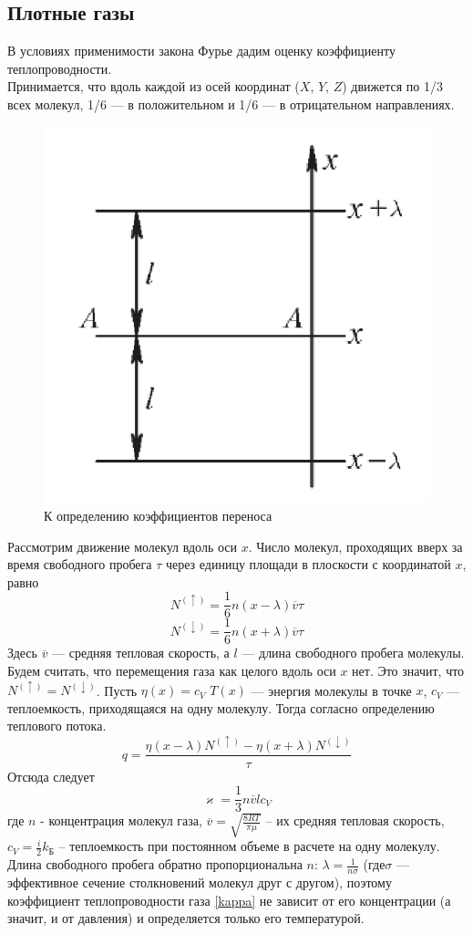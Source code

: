 \documentclass[12pt]{article}
\begin{document}
        \subsection{Плотные газы} В условиях применимости закона Фурье дадим оценку коэффициенту теплопроводности.\\
        Принимается, что вдоль каждой из осей координат ($X$, $Y$, $Z$) движется по 1/3 всех молекул, 1/6 — в положительном
        и 1/6 — в отрицательном направлениях.\\
        \begin{figure}[H]
            \centering
            \includegraphics[width=0.4\linewidth]{furie_image.png}
            \caption{К определению коэффициентов переноса}
            \label{fig:furie}
        \end{figure}
        Рассмотрим движение молекул вдоль оси $x$. Число молекул, проходящих вверх за время свободного пробега $\tau$ через
        единицу площади в плоскости с координатой $x$, равно
        \[ N^{(\uparrow)} = \frac{1}{6}n(x-\lambda) \overline{v} \tau \]
        \[ N^{(\downarrow)} = \frac{1}{6}n(x+\lambda) \overline{v} \tau \]
        Здесь $\overline{v}$ — средняя тепловая скорость, а $l$ — длина свободного пробега молекулы.\\
        Будем считать, что перемещения газа как целого вдоль оси $x$ нет. Это значит, что $N^{(\uparrow)} =  N^{(\downarrow)}$.
        Пусть $\eta(x) = c_V$ $T(x)$ — энергия молекулы в точке $x$, $c_V$ — теплоемкость, приходящаяся на одну молекулу.
        Тогда согласно определению теплового потока.
        \[
            q = \frac{\eta(x-\lambda)N^{(\uparrow)} - \eta(x+\lambda)N^{(\downarrow)}}{\tau}
        \]
        Отсюда следует
        \begin{equation}\label{kappa}
            \varkappa = \frac{1}{3} n \overline{v}lc_V
        \end{equation}
        где $n$ - концентрация молекул газа, $\overline{v} = \sqrt{\frac{8RT}{\pi\mu}}$ -- их средняя тепловая скорость,
        $c_V = \frac{i}{2}k_{\text{Б}}$ -- теплоемкость при постоянном объеме в расчете на одну молекулу.\\
        Длина свободного пробега обратно пропорциональна $n$: $\lambda = \frac{1}{n\sigma}$ (где$\sigma$ — эффективное
        сечение столкновений молекул друг с другом), поэтому коэффициент теплопроводности газа \ref{kappa} не зависит от его
        концентрации (а значит, и от давления) и определяется только его температурой.
\end{document}
